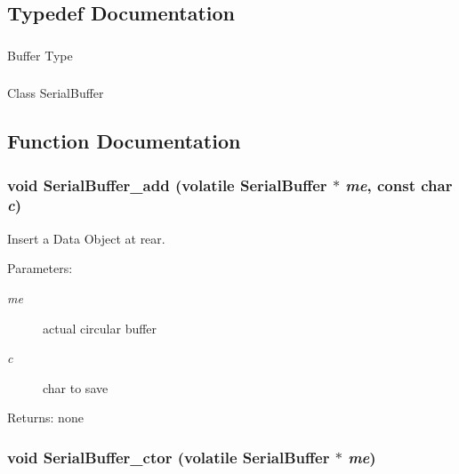 \subsection{Typedef Documentation}
\hypertarget{group___serial_g034c66ab1e1a09145312b106c2300a8b}{
\subsubsection[{buffertype}]{}}
\label{group___serial_g034c66ab1e1a09145312b106c2300a8b}


Buffer Type \hypertarget{group___serial_g36e664fa27ce3c7a3bac11261a96d3fc}{
\subsubsection[{SerialBuffer}]{}}
\label{group___serial_g36e664fa27ce3c7a3bac11261a96d3fc}


Class SerialBuffer 

\subsection{Function Documentation}
\hypertarget{group___serial_g2b16eeee32d0ed95d1beb03252b10933}{
\subsubsection[{SerialBuffer\_\-add}]{\setlength{\rightskip}{0pt plus 5cm}void SerialBuffer\_\-add (volatile {\bf SerialBuffer} $\ast$ {\em me}, \/  const char {\em c})}}
\label{group___serial_g2b16eeee32d0ed95d1beb03252b10933}


Insert a Data Object at rear. \begin{Desc}
\item[Parameters:]
\begin{description}
\item[{\em me}]actual circular buffer \item[{\em c}]char to save \end{description}
\end{Desc}
\begin{Desc}
\item[Returns:]none \end{Desc}
\hypertarget{group___serial_g4e993e27527b5b7362c46ca16fce9854}{
\subsubsection[{SerialBuffer\_\-ctor}]{\setlength{\rightskip}{0pt plus 5cm}void SerialBuffer\_\-ctor (volatile {\bf SerialBuffer} $\ast$ {\em me})}}
\label{group___serial_g4e993e27527b5b7362c46ca16fce9854}



